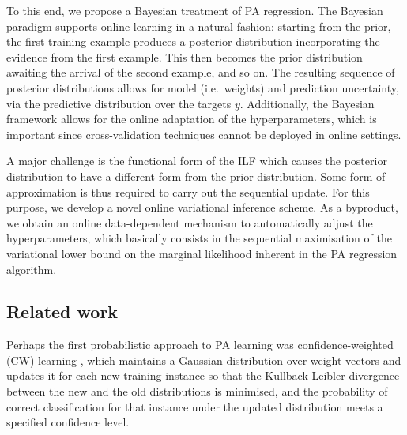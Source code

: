 To this end, we propose a Bayesian treatment of PA regression. The Bayesian paradigm supports online learning in a natural fashion: starting from the prior, the first training example produces a posterior distribution incorporating the evidence from the first example. This then becomes the prior distribution awaiting the arrival of the second example, and so on. The resulting sequence of posterior distributions allows for model (i.e.\ weights) and prediction uncertainty, via the predictive distribution over the targets $y$. Additionally, the Bayesian framework allows for the online adaptation of the hyperparameters, which is important since cross-validation techniques cannot be deployed in online settings.

A major challenge is the functional form of the ILF which causes the posterior distribution to have a different form from the prior distribution. Some form of approximation is thus required to carry out the sequential update. For this purpose, we develop a novel online variational inference scheme. As a byproduct, we obtain an online data-dependent mechanism to automatically adjust the hyperparameters, which basically consists in the sequential maximisation of the variational lower bound on the marginal likelihood inherent in the PA regression algorithm.

\subsection{Related work}

Perhaps the first probabilistic approach to PA learning was confidence-weighted (CW) learning \citep{dredze08}, which maintains a Gaussian distribution over weight vectors and updates it for each new training instance so that the Kullback-Leibler divergence between the new and the old distributions is minimised, and the probability of correct classification for that instance under the updated distribution meets a specified confidence level.

